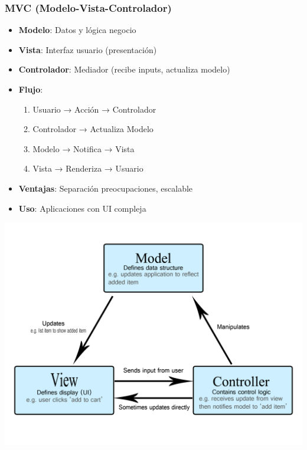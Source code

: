 \subsubsection{MVC (Modelo-Vista-Controlador)}
\begin{minipage}{0.65\textwidth}
    \begin{itemize}
        \item \textbf{Modelo}: Datos y lógica negocio
        \item \textbf{Vista}: Interfaz usuario (presentación)
        \item \textbf{Controlador}: Mediador (recibe inputs, actualiza modelo)
        \item \textbf{Flujo}:
        \begin{enumerate}
            \item Usuario → Acción → Controlador
            \item Controlador → Actualiza Modelo
            \item Modelo → Notifica → Vista
            \item Vista → Renderiza → Usuario
        \end{enumerate}
        \item \textbf{Ventajas}: Separación preocupaciones, escalable
        \item \textbf{Uso}: Aplicaciones con UI compleja
    \end{itemize}
\end{minipage}
\hfill
\begin{minipage}{0.5\textwidth}
    \includegraphics[width=\linewidth]{imagenes/model-view-controller-light-blue}
\end{minipage}

